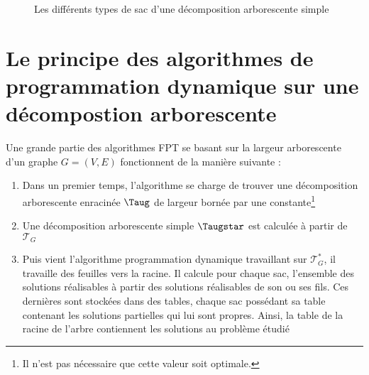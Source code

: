\begin{figure}
    \begin{center}
        \hfill
        \subfloat[Feuille]{\label{fig:feuille}
            \begin{tikzpicture}
                
            \end{tikzpicture}
        }
        \hfill
        \subfloat[Ajout]{\label{fig:ajout}
            \begin{tikzpicture}
                
            \end{tikzpicture}
        }
        \hfill
        \subfloat[Suppression]{\label{fig:suppression}
            \begin{tikzpicture}
                
            \end{tikzpicture}
        }
        \hfill
        \subfloat[Fusion]{\label{fig:fusion}
            \begin{tikzpicture}
                
            \end{tikzpicture}
        }
        \hfill
        \caption{Les différents types de sac d'une décomposition arborescente simple}
        \label{type_sac}
    \end{center}
\end{figure}
        


\section{Le principe des algorithmes de programmation dynamique sur une décompostion arborescente}
\label{pd_scheme}

Une grande partie des algorithmes FPT se basant sur la largeur arborescente d'un graphe $G = (V, E)$
fonctionnent de la manière suivante :
\begin{enumerate}
    \item Dans un premier temps, l'algorithme se charge de trouver une décomposition arborescente
        enracinée $\Taug$ de largeur bornée par une constante\footnote{Il n'est pas nécessaire que
        cette valeur soit optimale.}
    \item Une décomposition arborescente simple $\Taugstar$ est calculée à partir de $\mathcal{T}_G$
    \item Puis vient l'algorithme programmation dynamique travaillant sur $\mathcal{T}_G^*$, il
        travaille des feuilles vers la racine. Il calcule pour chaque sac, l'ensemble des solutions
        réalisables à partir des solutions réalisables de son ou ses fils. Ces dernières sont
        stockées dans des tables, chaque sac possédant sa table contenant les solutions partielles
        qui lui sont propres.  Ainsi, la table de la racine de l'arbre contiennent
        les solutions au problème étudié
\end{enumerate}

